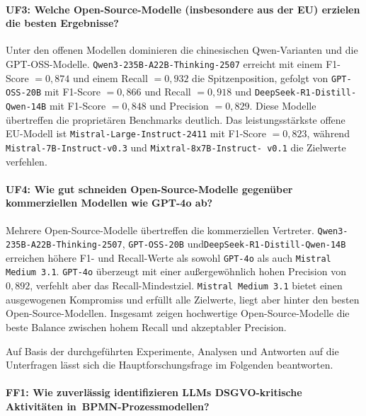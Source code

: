 \paragraph{UF3: Welche Open-Source-Modelle (insbesondere aus der EU) erzielen die besten Ergebnisse?}

Unter den offenen Modellen dominieren die chinesischen Qwen-Varianten und die GPT-OSS-Modelle. \texttt{Qwen3-235B-A22B-Thinking-2507} erreicht mit einem F1-Score $= 0{,}874$ und einem Recall $= 0{,}932$ die Spitzenposition, gefolgt von \texttt{GPT-OSS-20B} mit F1-Score $= 0{,}866$ und Recall $= 0{,}918$ und \texttt{DeepSeek-R1-Distill-Qwen-14B} mit F1-Score $= 0{,}848$ und Precision $= 0{,}829$. Diese Modelle übertreffen die proprietären Benchmarks deutlich. Das leistungsstärkste offene \ac{EU}-Modell ist \texttt{Mistral-Large-Instruct-2411} mit F1-Score $= 0{,}823$, während \texttt{Mistral-7B-Instruct-v0.3} und \texttt{Mixtral-8x7B-Instruct-\linebreak~v0.1} die Zielwerte verfehlen.

\paragraph{UF4: Wie gut schneiden Open-Source-Modelle gegenüber kommerziellen Modellen wie GPT-4o ab?}

Mehrere Open-Source-Modelle übertreffen die kommerziellen Vertreter. \texttt{Qwen3-235B-A22B-Thinking-2507}, \texttt{GPT-OSS-20B} und\linebreak\texttt{DeepSeek-R1-Distill-Qwen-14B} erreichen höhere F1- und Recall-Werte als sowohl \texttt{GPT-4o} als auch \texttt{Mistral Medium 3.1}. \texttt{GPT-4o} überzeugt mit einer außergewöhnlich hohen Precision von $0{,}892$, verfehlt aber das Recall-Mindestziel. \texttt{Mistral Medium 3.1} bietet einen ausgewogenen Kompromiss und erfüllt alle Zielwerte, liegt aber hinter den besten Open-Source-Modellen. Insgesamt zeigen hochwertige Open-Source-Modelle die beste Balance zwischen hohem Recall und akzeptabler Precision.

Auf Basis der durchgeführten Experimente, Analysen und Antworten auf die Unterfragen lässt sich die Hauptforschungsfrage im Folgenden beantworten.

\paragraph{FF1: Wie zuverlässig identifizieren \acp{LLM} DSGVO-kritische Aktivitäten in\linebreak~BPMN-Prozessmodellen?}

